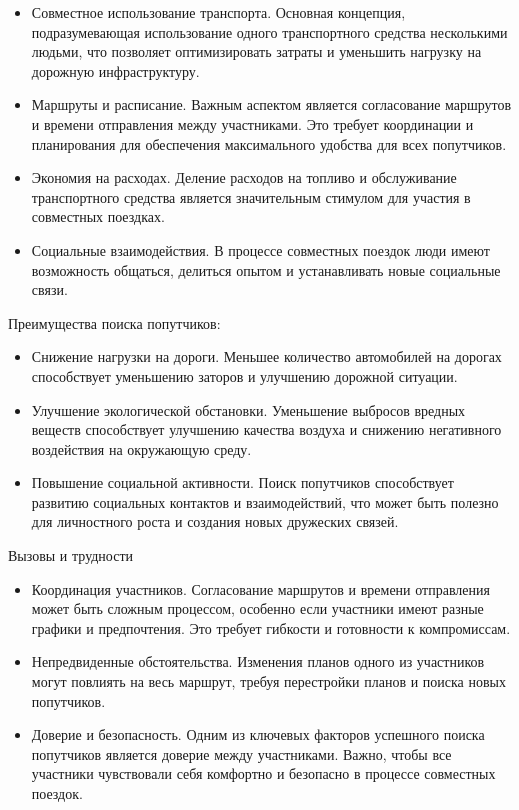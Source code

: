\begin{itemize}
\item Совместное использование транспорта. Основная концепция, подразумевающая использование одного транспортного средства несколькими людьми, что позволяет оптимизировать затраты и уменьшить нагрузку на дорожную инфраструктуру.

\item Маршруты и расписание. Важным аспектом является согласование маршрутов и времени отправления между участниками. Это требует координации и планирования для обеспечения максимального удобства для всех попутчиков.

\item Экономия на расходах. Деление расходов на топливо и обслуживание транспортного средства является значительным стимулом для участия в совместных поездках.

\item Социальные взаимодействия. В процессе совместных поездок люди имеют возможность общаться, делиться опытом и устанавливать новые социальные связи.
\end{itemize}

Преимущества поиска попутчиков:

\begin{itemize}
\item Снижение нагрузки на дороги. Меньшее количество автомобилей на дорогах способствует уменьшению заторов и улучшению дорожной ситуации.

\item Улучшение экологической обстановки. Уменьшение выбросов вредных веществ способствует улучшению качества воздуха и снижению негативного воздействия на окружающую среду.

\item Повышение социальной активности. Поиск попутчиков способствует развитию социальных контактов и взаимодействий, что может быть полезно для личностного роста и создания новых дружеских связей.
\end{itemize}

Вызовы и трудности

\begin{itemize}
\item Координация участников. Согласование маршрутов и времени отправления может быть сложным процессом, особенно если участники имеют разные графики и предпочтения. Это требует гибкости и готовности к компромиссам.

\item Непредвиденные обстоятельства. Изменения планов одного из участников могут повлиять на весь маршрут, требуя перестройки планов и поиска новых попутчиков.

\item Доверие и безопасность. Одним из ключевых факторов успешного поиска попутчиков является доверие между участниками. Важно, чтобы все участники чувствовали себя комфортно и безопасно в процессе совместных поездок.
\end{itemize}

